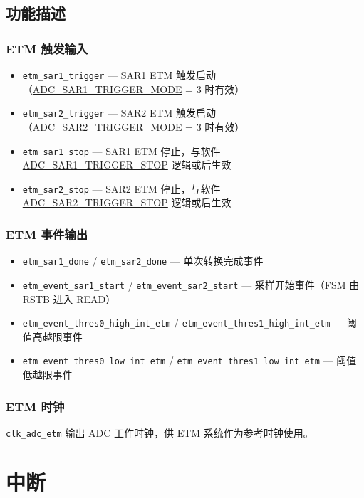 \documentclass[main\_\_CN.tex]{subfiles}
\begin{document}
\subsection{功能描述}
\label{sec:adc-etm-func-descr}

\subsubsection{ETM 触发输入}
\begin{itemize}
    \item \verb+etm_sar1_trigger+ — SAR1 ETM 触发启动（\hyperref[fielddesc:ADCSAR1TRIGGERMODE]{ADC\_SAR1\_TRIGGER\_MODE} = 3 时有效）
    \item \verb+etm_sar2_trigger+ — SAR2 ETM 触发启动（\hyperref[fielddesc:ADCSAR2TRIGGERMODE]{ADC\_SAR2\_TRIGGER\_MODE} = 3 时有效）
    \item \verb+etm_sar1_stop+ — SAR1 ETM 停止，与软件 \hyperref[fielddesc:ADCSAR1TRIGGERSTOP]{ADC\_SAR1\_TRIGGER\_STOP} 逻辑或后生效
    \item \verb+etm_sar2_stop+ — SAR2 ETM 停止，与软件 \hyperref[fielddesc:ADCSAR2TRIGGERSTOP]{ADC\_SAR2\_TRIGGER\_STOP} 逻辑或后生效
\end{itemize}

\subsubsection{ETM 事件输出}
\begin{itemize}
    \item \verb+etm_sar1_done+ / \verb+etm_sar2_done+ — 单次转换完成事件
    \item \verb+etm_event_sar1_start+ / \verb+etm_event_sar2_start+ — 采样开始事件（FSM 由 RSTB 进入 READ）
    \item \verb+etm_event_thres0_high_int_etm+ / \verb+etm_event_thres1_high_int_etm+ — 阈值高越限事件
    \item \verb+etm_event_thres0_low_int_etm+ / \verb+etm_event_thres1_low_int_etm+ — 阈值低越限事件
\end{itemize}

\subsubsection{ETM 时钟}
\verb+clk_adc_etm+ 输出 ADC 工作时钟，供 ETM 系统作为参考时钟使用。


\section{中断}
\label{sec:adc-intr}
\end{document}
